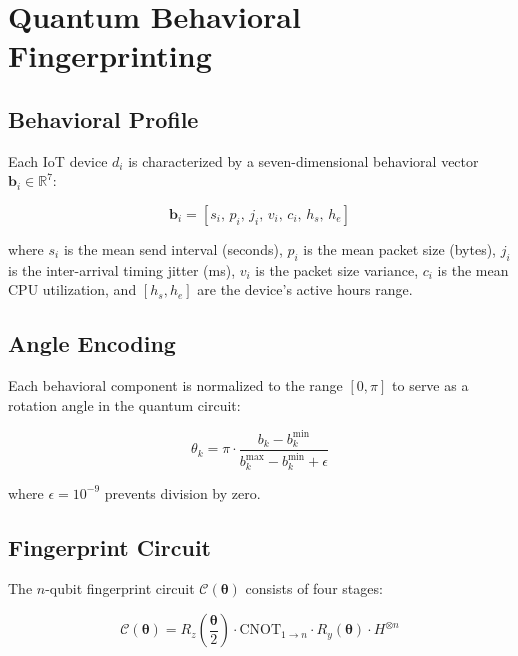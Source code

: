 
\section{Quantum Behavioral Fingerprinting}
\label{sec:qbf}

\subsection{Behavioral Profile}

Each IoT device $d_i$ is characterized by a seven-dimensional behavioral
vector $\mathbf{b}_i \in \mathbb{R}^7$:

\begin{equation}
\mathbf{b}_i = [s_i,\, p_i,\, j_i,\, v_i,\, c_i,\, h_s,\, h_e]
\label{eq:behavior}
\end{equation}

where $s_i$ is the mean send interval (seconds), $p_i$ is the mean packet
size (bytes), $j_i$ is the inter-arrival timing jitter (ms), $v_i$ is the
packet size variance, $c_i$ is the mean CPU utilization, and $[h_s, h_e]$
are the device's active hours range.

\subsection{Angle Encoding}

Each behavioral component is normalized to the range $[0, \pi]$ to serve
as a rotation angle in the quantum circuit:

\begin{equation}
\theta_k = \pi \cdot \frac{b_k - b_k^{\min}}{b_k^{\max} - b_k^{\min} + \epsilon}
\label{eq:encoding}
\end{equation}

where $\epsilon = 10^{-9}$ prevents division by zero.

\subsection{Fingerprint Circuit}

The $n$-qubit fingerprint circuit $\mathcal{C}(\boldsymbol{\theta})$
consists of four stages:

\begin{equation}
\mathcal{C}(\boldsymbol{\theta}) =
R_z\!\left(\frac{\boldsymbol{\theta}}{2}\right) \cdot
\text{CNOT}_{1 \to n} \cdot
R_y(\boldsymbol{\theta}) \cdot
H^{\otimes n}
\label{eq:circuit}
\end{equation}

